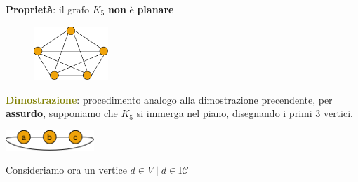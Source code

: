 \newpage
\begin{flushleft}
    \textbf{Proprietà}: il grafo $K_5$ \textbf{non} è \textbf{planare}

    \begin{figure}[h]
        \centering
        \includegraphics[width=0.25\textwidth]{img/k5}
    \end{figure}

    \begin{boxA}
        \textcolor{olive}{\textbf{Dimostrazione}}: procedimento analogo alla dimostrazione precendente, per \textbf{assurdo}, supponiamo che $K_5$ si immerga nel piano, disegnando i primi 3 vertici.

        \begin{center}
            \includegraphics[width=0.25\textwidth]{img/k5_1}
        \end{center}
        Consideriamo ora un vertice $d \in V \; | \; d \in \text{I}\mathcal{C}$


\end{boxA}
\end{flushleft}
